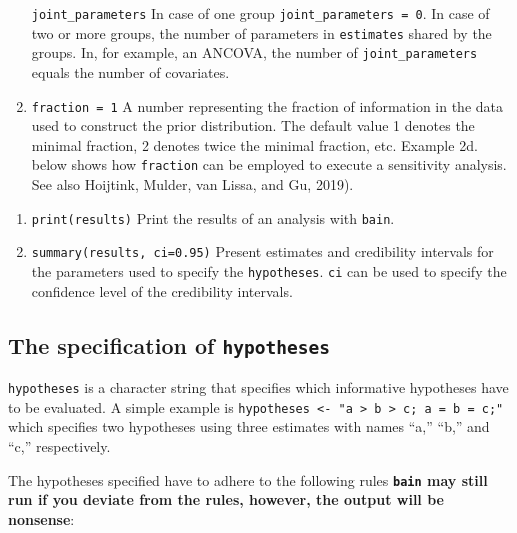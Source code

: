 \documentclass[
]{book}
\providecommand{\tightlist}{%
  \setlength{\itemsep}{0pt}\setlength{\parskip}{0pt}}
\begin{document}
\begin{enumerate}
  \texttt{joint\_parameters} In case of one group \texttt{joint\_parameters\ =\ 0}. In case of two or more groups, the number of parameters in
  \texttt{estimates} shared by the groups. In, for example, an ANCOVA, the number
  of \texttt{joint\_parameters} equals the number of covariates.
\item
  \texttt{fraction\ =\ 1} A number representing the fraction of information in the data used to construct the prior distribution. The default value 1 denotes the minimal fraction, 2 denotes twice the minimal fraction, etc. Example 2d. below shows how \texttt{fraction} can be employed to execute a sensitivity analysis. See also Hoijtink, Mulder, van Lissa, and Gu, 2019).
\end{enumerate}

\begin{enumerate}
\def\labelenumi{\arabic{enumi})}
\setcounter{enumi}{4}
\tightlist
\item
  \texttt{print(results)} Print the results of an analysis with
  \texttt{bain}.
\item
  \texttt{summary(results,\ ci=0.95)} Present estimates and credibility intervals for the parameters used to specify the \texttt{hypotheses}. \texttt{ci} can be used to specify the confidence level of the credibility intervals.
\end{enumerate}

\hypertarget{the-specification-of-hypotheses}{%
\subsection{\texorpdfstring{The specification of \texttt{hypotheses}}{The specification of hypotheses}}\label{the-specification-of-hypotheses}}

\texttt{hypotheses} is a character string that specifies which informative
hypotheses have to be evaluated. A simple example is \texttt{hypotheses\ \textless{}-\ "a\ \textgreater{}\ b\ \textgreater{}\ c;\ a\ =\ b\ =\ c;"} which specifies two hypotheses using three estimates with
names ``a,'' ``b,'' and ``c,'' respectively.

The hypotheses specified have to adhere to the following rules \textbf{\texttt{bain} may still run if you
deviate from the rules, however, the output will be nonsense}:
\end{document}
